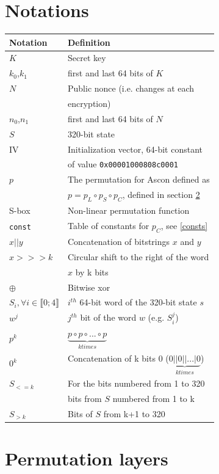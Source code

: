 \documentclass[a4paper,11pt,twocolumn]{article}
\begin{document}
		\section{Notations} \label{notations}
		\begin{tabular}{ll}
				\hline
				\textbf{Notation}&\textbf{Definition}\\
				\hline
				$K$&Secret key\\
				$k_0$,$k_1$&first and last 64 bits of $K$\\
				$N$&Public nonce (i.e. changes at each\\
				&encryption)\\
				$n_0$,$n_1$&first and last 64 bits of $N$\\
				$S$&320-bit state\\
				IV&Initialization vector, 64-bit constant\\
				&of value \verb|0x00001000808c0001|\\
				$p$&The permutation for Ascon defined as \\
				&$p=p_L \circ p_S \circ p_C$, defined in section \ref{perm}\\
				S-box&Non-linear permutation function\\
				\verb|const|&Table of constants for $p_C$, see \ref{consts}\\
				\hline
				$x||y$&Concatenation of bitstrings $x$ and $y$\\
				$x>>>k$&Circular shift to the right of the word\\
				&$x$ by k bits\\
				$\oplus$&Bitwise xor\\
				\hline
				$S_i, \forall i \in \llbracket 0;4 \rrbracket$&$i^{th}$ 64-bit word of the 320-bit state $s$\\
				$w^j$&$j^{th}$ bit of the word $w$ (e.g. $S_i^j$) \\
				$p^k$&$\underbrace{p \circ p \circ ... \circ p}_{k times}$\\
				$0^k$&Concatenation of k bits 0 ($\underbrace{0||0|| ... |0}_{k times}$)\\
				$S_{<=k}$&For the bits numbered from 1 to 320\\ &bits from $S$ numbered from 1 to k\\
				$S_{>k}$&Bits of $S$ from k+1 to 320\\
				\hline
			\end{tabular}
			
		
		\section{Permutation layers} \label{perm}
		
\end{document}

